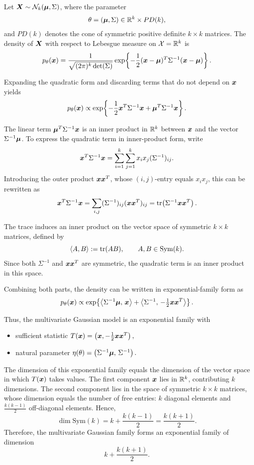 \begin{ex}
Let \(\boldsymbol{X} \sim \mathcal{N}_{k}(\boldsymbol{\mu},\Sigma)\), where the parameter
\[
\theta = (\boldsymbol{\mu},\Sigma) \in \mathbb{R}^{k} \times PD(k),
\]
and \(PD(k)\) denotes the cone of symmetric positive definite \(k\times k\) matrices.
The density of \(\boldsymbol{X}\) with respect to Lebesgue measure on \(\mathcal{X}=\mathbb{R}^{k}\) is
\[
p_{\theta}(\boldsymbol{x})
= \frac{1}{\sqrt{(2\pi)^{k}\det(\Sigma)}}
\exp\!\left\{
-\frac{1}{2}(\boldsymbol{x}-\boldsymbol{\mu})^{T}\Sigma^{-1}(\boldsymbol{x}-\boldsymbol{\mu})
\right\}.
\]

\medskip
Expanding the quadratic form and discarding terms that do not depend on \(\boldsymbol{x}\) yields
\[
p_{\theta}(\boldsymbol{x})
\propto
\exp\!\left\{
-\frac{1}{2}\boldsymbol{x}^{T}\Sigma^{-1}\boldsymbol{x}
+ \boldsymbol{\mu}^{T}\Sigma^{-1}\boldsymbol{x}
\right\}.
\]

\medskip
The linear term \(\boldsymbol{\mu}^{T}\Sigma^{-1}\boldsymbol{x}\) is an inner product in \(\mathbb{R}^{k}\) between
\(\boldsymbol{x}\) and the vector \(\Sigma^{-1}\boldsymbol{\mu}\).
To express the quadratic term in inner-product form, write
\[
\boldsymbol{x}^{T}\Sigma^{-1}\boldsymbol{x}
= \sum_{i=1}^{k}\sum_{j=1}^{k} x_i x_j (\Sigma^{-1})_{ij}.
\]
Introducing the outer product \(\boldsymbol{x}\boldsymbol{x}^{T}\), whose \((i,j)\)-entry equals \(x_i x_j\),
this can be rewritten as
\[
\boldsymbol{x}^{T}\Sigma^{-1}\boldsymbol{x}
= \sum_{i,j} (\Sigma^{-1})_{ij} (\boldsymbol{x}\boldsymbol{x}^{T})_{ij}
= \operatorname{tr}\!\left( \Sigma^{-1}\boldsymbol{x}\boldsymbol{x}^{T} \right).
\]

\medskip
The trace induces an inner product on the vector space of symmetric \(k\times k\) matrices,
defined by
\[
\langle A,B\rangle := \operatorname{tr}(AB),
\qquad A,B \in \mathrm{Sym}(k).
\]
Since both \(\Sigma^{-1}\) and \(\boldsymbol{x}\boldsymbol{x}^{T}\) are symmetric, the quadratic term is an
inner product in this space.

\medskip
Combining both parts, the density can be written in exponential-family form as
\[
p_{\theta}(\boldsymbol{x})
\propto
\exp\!\left\{
\left\langle \Sigma^{-1}\boldsymbol{\mu},\, \boldsymbol{x} \right\rangle
+
\left\langle \Sigma^{-1},\, -\tfrac12 \boldsymbol{x}\boldsymbol{x}^{T} \right\rangle
\right\}.
\]

\medskip
Thus, the multivariate Gaussian model is an exponential family with
\begin{itemize}
    \item sufficient statistic
    \(
    T(\boldsymbol{x}) = \left(\boldsymbol{x}, -\tfrac12 \boldsymbol{x}\boldsymbol{x}^{T}\right),
    \)
    \item natural parameter
    \(
    \eta(\theta) = \left(\Sigma^{-1}\boldsymbol{\mu},\, \Sigma^{-1}\right).
    \)
\end{itemize}

\medskip
The dimension of this exponential family equals the dimension of the vector space in which
\(T(\boldsymbol{x})\) takes values.
The first component \(\boldsymbol{x}\) lies in \(\mathbb{R}^{k}\), contributing \(k\) dimensions.
The second component lies in the space of symmetric \(k\times k\) matrices, whose dimension
equals the number of free entries:
\(k\) diagonal elements and \(\frac{k(k-1)}{2}\) off-diagonal elements.
Hence,
\[
\dim \mathrm{Sym}(k) = k + \frac{k(k-1)}{2} = \frac{k(k+1)}{2}.
\]
Therefore, the multivariate Gaussian family forms an exponential family of dimension
\[
k + \frac{k(k+1)}{2}.
\]
\end{ex}

